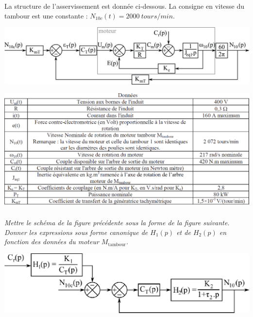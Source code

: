 \documentclass[10pt,fleqn]{article} %
\begin{document}
\begin{multicols}{2}
\fi

La structure de l’asservissement est donnée ci-dessous. La consigne en vitesse du tambour est une
constante : $N_{10c}(t)=\SI{2000}{tours/min}$.

\begin{center}
\includegraphics[width=\linewidth]{images/fig_03}
\end{center}

\begin{center}
\includegraphics[width=\linewidth]{images/fig_04}
\end{center}



\subparagraph{}\textit{Mettre le schéma de la figure précédente sous la forme de la figure suivante. Donner les expressions sous forme canonique de $H_1(p)$ et de $H_2(p)$ en fonction des données du moteur $M_{\text{tambour}}$.}
\ifprof
\begin{corrige}
\end{corrige}
\else
\fi

\begin{center}
\includegraphics[width=\linewidth]{images/fig_05}
\end{center}


\end{multicols}
\end{document}
